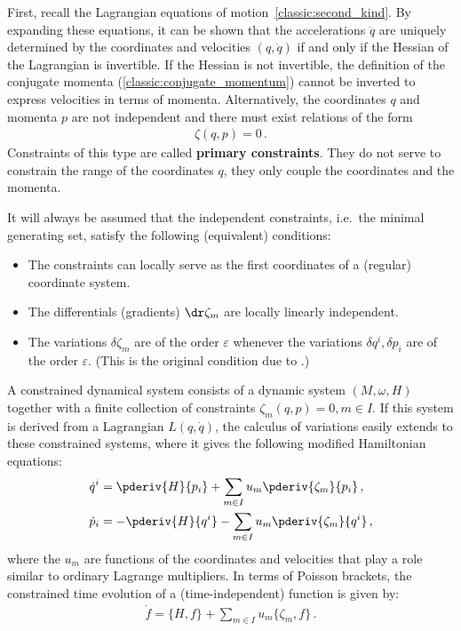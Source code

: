     First, recall the Lagrangian equations of motion~\eqref{classic:second_kind}. By expanding these equations, it can be shown that the accelerations $\ddot{q}$ are uniquely determined by the coordinates and velocities $(q,\dot{q})$ if and only if the Hessian of the Lagrangian is invertible. If the Hessian is not invertible, the definition of the conjugate momenta (\cref{classic:conjugate_momentum}) cannot be inverted to express velocities in terms of momenta. Alternatively, the coordinates $q$ and momenta $p$ are not independent and there must exist relations of the form
    \begin{gather}
        \zeta(q,p) = 0\,.
    \end{gather}
    Constraints of this type are called \textbf{primary constraints}. They do not serve to constrain the range of the coordinates $q$, they only couple the coordinates and the momenta.

    \begin{axiom}\label{constraint:regularity}
        It will always be assumed that the independent constraints, i.e.~the minimal generating set, satisfy the following (equivalent) conditions:
        \begin{itemize}
            \item The constraints can locally serve as the first coordinates of a (regular) coordinate system.
            \item The differentials (gradients) $\dr\zeta_m$ are locally linearly independent.
            \item The variations $\delta\zeta_m$ are of the order $\varepsilon$ whenever the variations $\delta q^i,\delta p_i$ are of the order $\varepsilon$. (This is the original condition due to .)
        \end{itemize}
    \end{axiom}

    A constrained dynamical system consists of a dynamic system $(M,\omega,H)$ together with a finite collection of constraints $\zeta_m(q,p)=0,m\in I$. If this system is derived from a Lagrangian $L(q,\dot{q})$, the calculus of variations easily extends to these constrained systems, where it gives the following modified Hamiltonian equations:
    \begin{align}
        \dot{q}^i &= \pderiv{H}{p_i} + \sum_{m\in I}u_m\pderiv{\zeta_m}{p_i}\,,\\
        \dot{p}_i &= -\pderiv{H}{q^i} - \sum_{m\in I}u_m\pderiv{\zeta_m}{q^i}\,,
    \end{align}
    where the $u_m$ are functions of the coordinates and velocities that play a role similar to ordinary Lagrange multipliers. In terms of Poisson brackets, the constrained time evolution of a (time-independent) function is given by:
    \begin{gather}
        \label{constraint:modified_poisson_evolution}
        \dot{f} = \{H,f\} + \sum_{m\in I}u_m\{\zeta_m,f\}\,.
    \end{gather}

